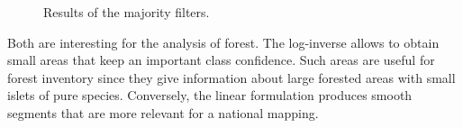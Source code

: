 \begin{figure}[htbp]
\begin{center}
\begingroup
\captionsetup[subfigure]{width=0.3\textwidth}
\hspace*{0.025\textwidth}
\hspace*{0.025\textwidth}
\endgroup
\caption{Results of the majority filters.}
\label{fig:C3_S3_ss4_unary}
\end{center}
\end{figure}

Both are interesting for the analysis of forest. The log-inverse allows to obtain small areas that keep an important class confidence. Such areas are useful for forest inventory since they give information about large forested areas with small islets of pure species. Conversely, the linear formulation produces smooth segments that are more relevant for a national mapping.


